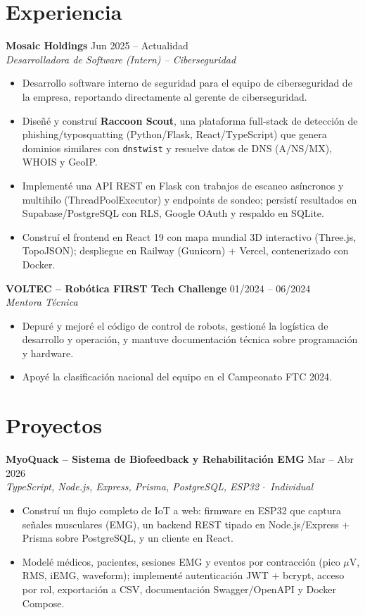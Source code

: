 \documentclass[10pt,letterpaper]{article}
\newcommand{\project}[3]{\vspace{2pt}\textbf{#1} \hfill #2 \\ \textit{#3} \par\vspace{1pt}}
\newcommand{\resumeSubheading}[3]{%
  \vspace{2pt}\textbf{#1} \hfill #2 \\
  \textit{#3} \\
}
\begin{document}
\section{Experiencia}
\resumeSubheading{Mosaic Holdings}{Jun 2025 -- Actualidad}{Desarrolladora de Software (Intern) -- Ciberseguridad}
\begin{itemize}
    \item Desarrollo software interno de seguridad para el equipo de ciberseguridad de la empresa, reportando directamente al gerente de ciberseguridad.
    \item Dise\~n\'e y constru\'i \textbf{Raccoon Scout}, una plataforma full-stack de detecci\'on de phishing/typosquatting (Python/Flask, React/TypeScript) que genera dominios similares con \texttt{dnstwist} y resuelve datos de DNS (A/NS/MX), WHOIS y GeoIP.
    \item Implement\'e una API REST en Flask con trabajos de escaneo as\'incronos y multihilo (ThreadPoolExecutor) y endpoints de sondeo; persist\'i resultados en Supabase/PostgreSQL con RLS, Google OAuth y respaldo en SQLite.
    \item Constru\'i el frontend en React 19 con mapa mundial 3D interactivo (Three.js, TopoJSON); despliegue en Railway (Gunicorn) + Vercel, contenerizado con Docker.
\end{itemize}

\resumeSubheading{VOLTEC -- Robótica FIRST Tech Challenge}{01/2024 -- 06/2024}{Mentora T\'ecnica}
\begin{itemize}
    \item Depur\'e y mejor\'e el c\'odigo de control de robots, gestion\'e la log\'istica de desarrollo y operaci\'on, y mantuve documentaci\'on t\'ecnica sobre programaci\'on y hardware.
    \item Apoy\'e la clasificaci\'on nacional del equipo en el Campeonato FTC 2024.
\end{itemize}

\section{Proyectos}
\project{MyoQuack -- Sistema de Biofeedback y Rehabilitaci\'on EMG}{Mar -- Abr 2026}{TypeScript, Node.js, Express, Prisma, PostgreSQL, ESP32 \quad $\cdot$\ Individual}
\begin{itemize}
    \item Constru\'i un flujo completo de IoT a web: firmware en ESP32 que captura se\~nales musculares (EMG), un backend REST tipado en Node.js/Express + Prisma sobre PostgreSQL, y un cliente en React.
    \item Model\'e m\'edicos, pacientes, sesiones EMG y eventos por contracci\'on (pico $\mu$V, RMS, iEMG, waveform); implement\'e autenticaci\'on JWT + bcrypt, acceso por rol, exportaci\'on a CSV, documentaci\'on Swagger/OpenAPI y Docker Compose.
\end{itemize}
\end{document}
